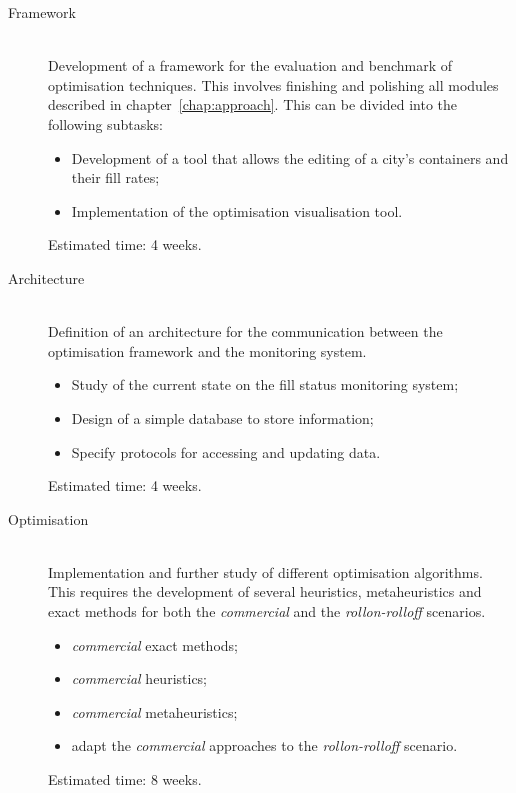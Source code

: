 \begin{description}
\item[Framework] \hfill \\
Development of a framework for the evaluation and benchmark of optimisation
techniques. This involves finishing and polishing all modules described in
chapter~\ref{chap:approach}. This can be divided into the following subtasks:

\begin{itemize}
	\item Development of a tool that allows the editing of a city's containers and their fill rates;
	\item Implementation of the optimisation visualisation tool.
\end{itemize}

Estimated time: 4 weeks.

\item[Architecture] \hfill \\
Definition of an architecture for the communication between the optimisation
framework and the monitoring system.

\begin{itemize}
	\item Study of the current state on the fill status monitoring system;
	\item Design of a simple database to store information;
	\item Specify protocols for accessing and updating data.
\end{itemize}


Estimated time: 4 weeks.

\item[Optimisation] \hfill \\
Implementation and further study of different optimisation algorithms. This
requires the development of several heuristics, metaheuristics and exact methods
for both the \textit{commercial} and the \textit{rollon-rolloff} scenarios.

\begin{itemize}
	\item \textit{commercial} exact methods;
	\item \textit{commercial} heuristics;
	\item \textit{commercial} metaheuristics;
	\item adapt the \textit{commercial} approaches to the \textit{rollon-rolloff} scenario.
\end{itemize}

Estimated time: 8 weeks.


\end{description}
